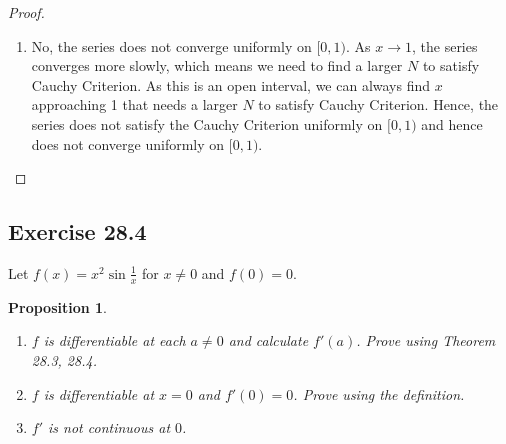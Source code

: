 \documentclass{article}
\newtheorem{proposition}[thm]{Proposition}
\begin{document}
\begin{proof}
\begin{enumerate}[label=\textbf{(\alph*)}]
        \item No, the series does not converge uniformly on $[0,1)$. As $x\to 1$,
        the series converges more slowly, which means we need to find a larger $N$ to satisfy
        Cauchy Criterion. As this is an open interval, we can always find $x$ approaching 1 that needs a larger
        $N$ to satisfy Cauchy Criterion. Hence, the series does not satisfy the Cauchy Criterion
        uniformly on $[0,1)$ and hence does not converge uniformly on $[0,1)$.
        
    \end{enumerate}
\end{proof}

\newpage
\subsection*{Exercise 28.4}
Let $f(x)=x^2\sin \frac{1}{x}$ for $x\neq 0$ and $f(0)=0$.
\begin{proposition}
    \begin{enumerate}[label=\textbf{(\alph*)}]\indent
        \item $f$ is differentiable at each $a\neq 0$ and calculate $f'(a)$. Prove using 
        \emph{Theorem 28.3, 28.4}.
        \item $f$ is differentiable at $x=0$ and $f'(0)=0$. Prove using the definition.
        \item $f'$ is not continuous at $0$.
    \end{enumerate}
\end{proposition}
\end{document}
